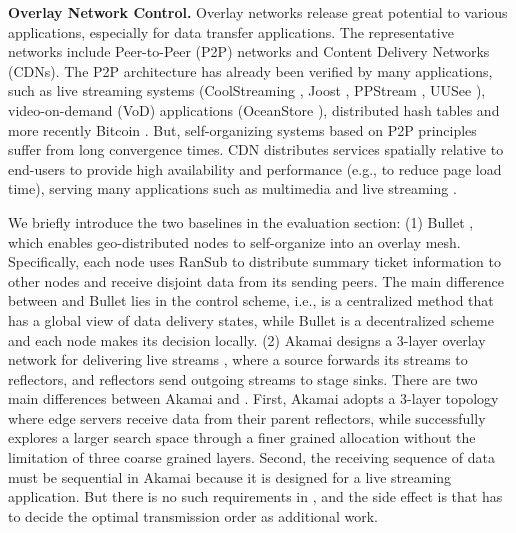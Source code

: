 \textbf{Overlay Network Control.}
Overlay networks release great potential to various applications, especially for data transfer applications. The representative networks include Peer-to-Peer (P2P) networks and Content Delivery Networks (CDNs). The P2P architecture has already been verified by many applications, such as live streaming systems (CoolStreaming \cite{zhang2005coolstreaming}, Joost \cite{Joost}, PPStream \cite{PPStream}, UUSee \cite{UUSee}), video-on-demand (VoD) applications (OceanStore \cite{oceanstore}), distributed hash tables \cite{rhea2005opendht} and more recently Bitcoin \cite{eyal2016bitcoin}. But, self-organizing systems based on P2P principles suffer from long convergence times. CDN distributes services spatially relative to end-users to provide high availability and performance (e.g., to reduce page load time), serving many applications such as multimedia \cite{zhu2011multimedia} and live streaming \cite{sripanidkulchai2004analysis}.

We briefly introduce the two baselines in the evaluation section: (1) Bullet \cite{kostic2003bullet}, which enables geo-distributed nodes to self-organize into an overlay mesh. Specifically, each node uses RanSub \cite{Rodriguez2003Using} to distribute summary ticket information to other nodes and receive disjoint data from its sending peers. The main difference between \name and Bullet lies in the control scheme, i.e., \name is a centralized method that has a global view of data delivery states, while Bullet is a decentralized scheme and each node makes its decision locally. (2) Akamai designs a 3-layer overlay network for delivering live streams \cite{Andreev2013Designing}, where a source forwards its streams to reflectors, and reflectors send outgoing streams to stage sinks. There are two main differences between Akamai and \name. First, Akamai adopts a 3-layer topology where edge servers receive data from their parent reflectors, while \name successfully explores a larger search space through a finer grained allocation without the limitation of three coarse grained layers. Second, the receiving sequence of data must be sequential in Akamai because it is designed for a live streaming application. But there is no such requirements in \name, and the side effect is that \name has to decide the optimal transmission order as additional work.


